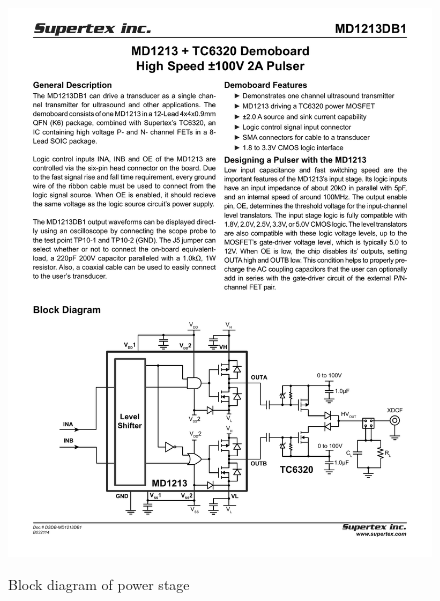\begin{figure}[htbp]
	\centering
	\includegraphics[width=\textwidth]{Figures/3_power_stage_block.pdf}
	\label{fig:3_power_stage}
	\caption[Block diagram of power stage]{Block diagram of power stage \cite{MD1213DB1}}
\end{figure}
